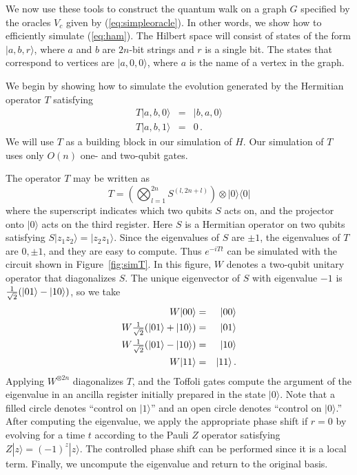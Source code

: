 \documentclass[aps,11pt,twoside,nofootinbib,tightenlines,superscriptaddress,preprintnumbers]{revtex4}
\newcommand{\<}{\langle}
\renewcommand{\>}{\rangle}
\newcommand{\be}{\begin{equation}}
\newcommand{\ee}{\end{equation}}
\newcommand{\bea}{\begin{eqnarray}}
\newcommand{\eea}{\end{eqnarray}}
\begin{document}
We now use these tools to construct the quantum walk on a graph $G$
specified by the oracles $V_c$ given by (\ref{eq:simpleoracle}).  In other
words, we show how to efficiently simulate (\ref{eq:ham}).  The 
Hilbert space will consist of states of the form $|a, b, r\>$, where $a$
and $b$ are $2n$-bit strings and $r$ is a single bit.  The states that
correspond to vertices are $|a, 0, 0\>$, where $a$ is the name of a vertex
in the graph.

We begin by showing how to simulate the evolution generated by the
Hermitian operator $T$ satisfying
\bea
  T |a, b, 0\> &=& |b, a, 0\> \\
  T |a, b, 1\> &=& 0
\,.
\eea
We will use $T$ as a building block in our simulation of $H$.  Our
simulation of $T$ uses only $O(n)$ one- and two-qubit gates.

The operator $T$ may be written as
\be
  T = \left( \bigotimes_{l=1}^{2n} S^{(l,2n+l)} \right) \otimes |0\>\<0|
\label{eq:swap}
\ee
where the superscript indicates which two qubits $S$ acts on, and the
projector onto $|0\>$ acts on the third register.  Here $S$ is a Hermitian
operator on two qubits satisfying $S |z_1 z_2\> = |z_2 z_1\>$.  Since the
eigenvalues of $S$ are $\pm1$, the eigenvalues of $T$ are $0,\pm1$, and
they are easy to compute.  Thus $e^{-i T t}$ can be simulated with the
circuit shown in Figure~\ref{fig:simT}.  In this figure, $W$ denotes a
two-qubit unitary operator that diagonalizes $S$.  The unique eigenvector
of $S$ with eigenvalue $-1$ is ${1 \over \sqrt2}(|01\>-|10\>)$, so we take
\bea
  W |00\> &=& |00\> \\
  W {\textstyle{1 \over \sqrt2}}(|01\> + |10\>) &=& |01\> \\
  W {\textstyle{1 \over \sqrt2}}(|01\> - |10\>) &=& |10\> \\
  W |11\> &=& |11\>
\,.
\eea
Applying $W^{\otimes 2n}$ diagonalizes $T$, and the Toffoli gates compute
the argument of the eigenvalue in an ancilla register initially prepared
in the state $|0\>$.  Note that a filled circle denotes ``control on
$|1\>$'' and an open circle denotes ``control on $|0\>$.''  After
computing the eigenvalue, we apply the appropriate phase shift if $r=0$ by
evolving for a time $t$ according to the Pauli $Z$ operator satisfying
$Z|z\>=(-1)^z |z\>$.  The controlled phase shift can be performed since it
is a local term.  Finally, we uncompute the eigenvalue and return to the
original basis.
\end{document}
